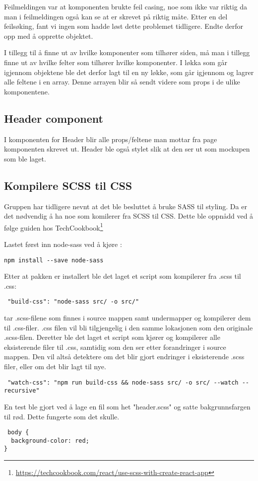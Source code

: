 Feilmeldingen var at komponenten brukte feil casing, noe som ikke var riktig da man i feilmeldingen også kan se at  er skrevet på riktig måte. Etter en del feilsøking, fant vi ingen som hadde løst dette problemet tidligere. Endte derfor opp med å opprette objektet. 

I tillegg til å finne ut av hvilke komponenter som tilhører siden, må man i tillegg finne ut av hvilke felter som tilhører hvilke komponenter. I løkka som går igjennom objektene ble det derfor lagt til en ny løkke, som går igjennom og lagrer alle feltene i en array. Denne arrayen blir så sendt videre som props i de ulike komponentene.

\subsection{Header component}
I komponenten for Header blir alle props/feltene man mottar fra page komponenten skrevet ut. Header ble også stylet slik at den ser ut som mockupen som ble laget.

\subsection{Kompilere SCSS til CSS}
Gruppen har tidligere nevnt at det ble besluttet å bruke SASS til styling. Da er det nødvendig å ha noe som komilerer fra SCSS til CSS. Dette ble oppnådd ved å følge guiden hos TechCookbook\footnote{\url{https://techcookbook.com/react/use-scss-with-create-react-app}}

Lastet først inn node-sass ved å kjøre :

\begin{lstlisting}
npm install --save node-sass
\end{lstlisting}

Etter at pakken er installert ble det laget et script som kompilerer fra .scss til .css:

\begin{lstlisting}
 "build-css": "node-sass src/ -o src/"
\end{lstlisting}
\clearpage

 tar .scss-filene som finnes i source mappen samt undermapper og kompilerer dem til .css-filer. .css filen vil bli tilgjengelig i den samme lokasjonen som den originale .scss-filen. Deretter ble det laget et script som kjører  og kompilerer alle eksisterende filer til .css, samtidig som den ser etter forandringer i source mappen. Den vil altså detektere om det blir gjort endringer i eksisterende .scss filer, eller om det blir lagt til nye. 

\begin{lstlisting}
 "watch-css": "npm run build-css && node-sass src/ -o src/ --watch --recursive"
\end{lstlisting}

En test ble gjort ved å lage en fil som het "header.scss" og satte bakgrunnsfargen til rød. Dette fungerte som det skulle.

\begin{lstlisting}
 body {
  background-color: red;
}
\end{lstlisting}